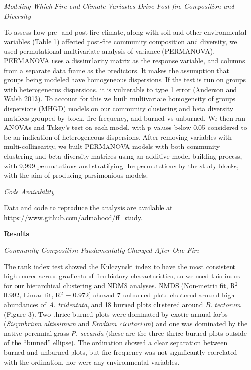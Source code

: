 \documentclass[12pt,]{article}
\begin{document}
\emph{Modeling Which Fire and Climate Variables Drive Post-fire
Composition and Diversity}

To assess how pre- and post-fire climate, along with soil and other
environmental variables (Table 1) affected post-fire community
composition and diversity, we used permutational multivariate analysis
of variance (PERMANOVA). PERMANOVA uses a dissimilarity matrix as the
response variable, and columns from a separate data frame as the
predictors. It makes the assumption that groups being modeled have
homogeneous dispersions. If the test is run on groups with heterogeneous
dispersions, it is vulnerable to type 1 error (Anderson and Walsh 2013).
To account for this we built multivariate homogeneity of groups
dispersions (MHGD) models on our community clustering and beta diversity
matrices grouped by block, fire frequency, and burned vs unburned. We
then ran ANOVAs and Tukey's test on each model, with p values below 0.05
considered to be an indication of heterogeneous dispersions. After
removing variables with multi-collinearity, we built PERMANOVA models
with both community clustering and beta diversity matrices using an
additive model-building process, with 9,999 permutations and stratifying
the permutations by the study blocks, with the aim of producing
parsimonious models.

\emph{Code Availability}

Data and code to reproduce the analysis are available at
\url{https://www.github.com/admahood/ff_study}.

\textbf{Results}

\emph{Community Composition Fundamentally Changed After One Fire}

The rank index test showed the Kulczynski index to have the most
consistent high scores across gradients of fire history characteristics,
so we used this index for our hierarchical clustering and NDMS analyses.
NMDS (Non-metric fit, R\(^2\) = 0.992, Linear fit, R\(^2\) = 0.972)
showed 7 unburned plots clustered around high abundances of \emph{A.
tridentata}, and 18 burned plots clustered around \emph{B. tectorum}
(Figure 3). Two thrice-burned plots were dominated by exotic annual
forbs (\emph{Sisymbrium altissimum} and \emph{Erodium cicutarium}) and
one was dominated by the native perennial grass \emph{P. secunda} (these
are the three thrice-burned plots outside of the ``burned'' ellipse).
The ordination showed a clear separation between burned and unburned
plots, but fire frequency was not significantly correlated with the
ordination, nor were any environmental variables.
\end{document}
